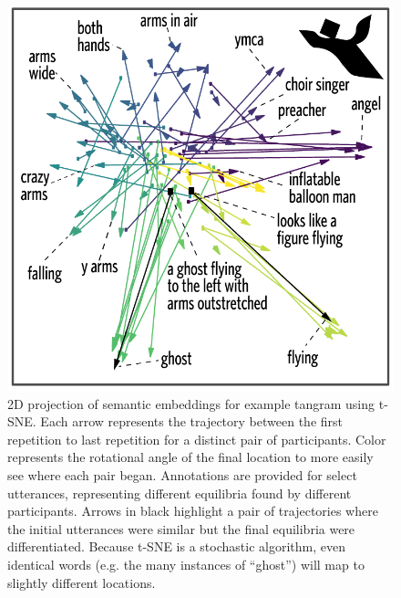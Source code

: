 \documentclass[alpha-refs]{wiley-article}
\begin{document}
\begin{figure}[t!]
\centering
\includegraphics[scale=.8]{tsne-tangramC_annotated.pdf}
\caption{2D projection of semantic embeddings for example tangram using t-SNE. Each arrow represents the trajectory between the first repetition to last repetition for a distinct pair of participants. Color represents the rotational angle of the final location to more easily see where each pair began. Annotations are provided for select utterances, representing different equilibria found by different participants. Arrows in black highlight a pair of trajectories where the initial utterances were similar but the final equilibria were differentiated. Because t-SNE is a stochastic algorithm, even identical words (e.g. the many instances of ``ghost'') will map to slightly different locations.}
\label{fig:tsne}
\end{figure}
\end{document}
